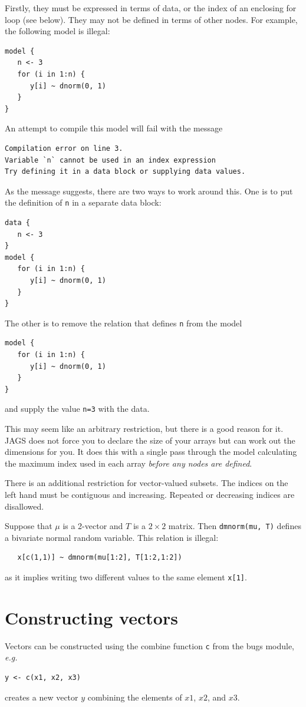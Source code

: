 \documentclass[11pt, a4paper, titlepage]{report}
\begin{document}
Firstly, they must be expressed in terms of data, or the index of an
enclosing for loop (see below). They may not be defined in terms of
other nodes. For example, the following model is illegal:
\begin{verbatim}
model {
   n <- 3
   for (i in 1:n) {
      y[i] ~ dnorm(0, 1)
   }
}
\end{verbatim}
An attempt to compile this model will fail with the message
\begin{verbatim}
Compilation error on line 3.
Variable `n` cannot be used in an index expression
Try defining it in a data block or supplying data values.
\end{verbatim}
As the message suggests, there are two ways to work around this. One
is to put the definition of \texttt{n} in a separate data block:
\begin{verbatim}
data {
   n <- 3
}
model {
   for (i in 1:n) {
      y[i] ~ dnorm(0, 1)
   }
}
\end{verbatim}
The other is to remove the relation that defines \texttt{n} from the model
\begin{verbatim}
model {
   for (i in 1:n) {
      y[i] ~ dnorm(0, 1)
   }
}
\end{verbatim}
and supply the value \texttt{n=3} with the data.

This may seem like an arbitrary restriction, but there is a good
reason for it. JAGS does not force you to declare the size of your
arrays but can work out the dimensions for you. It does this with a
single pass through the model calculating the maximum index used in
each array {\em before any nodes are defined}. 

There is an additional restriction for vector-valued subsets. The
indices on the left hand must be contiguous and increasing. Repeated
or decreasing indices are disallowed.

Suppose that $\mu$ is a 2-vector and $T$ is a $2 \times 2$
matrix. Then \verb+dmnorm(mu, T)+ defines a bivariate normal random
variable.  This relation is illegal:
\begin{verbatim}
   x[c(1,1)] ~ dmnorm(mu[1:2], T[1:2,1:2])
\end{verbatim}
as it implies writing two different values to the same element \verb+x[1]+.

\section{Constructing vectors}

Vectors can be constructed using the combine function \texttt{c} from
the \textsf{bugs} module, {\em  e.g.}
\begin{verbatim}
y <- c(x1, x2, x3)
\end{verbatim}
creates a new vector $y$ combining the elements of $x1$, $x2$, and $x3$.    
\end{document}
